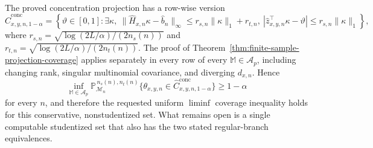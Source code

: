 The proved concentration projection has a row-wise version
\[
\widehat C^{\mathrm{conc}}_{x,y,n,1-\alpha}
=\left\{\vartheta\in[0,1]:\exists\kappa,
\ \lVert\widehat H_{x,n}\kappa-\widehat b_n\rVert_\infty
\le r_{s,n}\lVert\kappa\rVert_1+r_{t,n},\ 
|\widehat z_{x,y,n}^{\top}\kappa-\vartheta|
\le r_{s,n}\lVert\kappa\rVert_1\right\},
\]
where \(r_{s,n}=\sqrt{\log(2L/\alpha)/(2n_s(n))}\) and \(r_{t,n}=\sqrt{\log(2L/\alpha)/(2n_t(n))}\). The proof of Theorem~\ref{thm:finite-sample-projection-coverage} applies separately in every row of every \(\mathbb M\in\mathcal A_p\), including changing rank, singular multinomial covariance, and diverging \(d_{x,n}\). Hence
\[
\inf_{\mathbb M\in\mathcal A_p}
\mathbb P_{\mathcal M_n}^{\,n_s(n),n_t(n)}
\{\theta_{x,y,n}\in\widehat C^{\mathrm{conc}}_{x,y,n,1-\alpha}\}
\ge1-\alpha
\]
for every \(n\), and therefore the requested uniform \(\liminf\) coverage inequality holds for this conservative, nonstudentized set. What remains open is a single computable studentized set that also has the two stated regular-branch equivalences.
